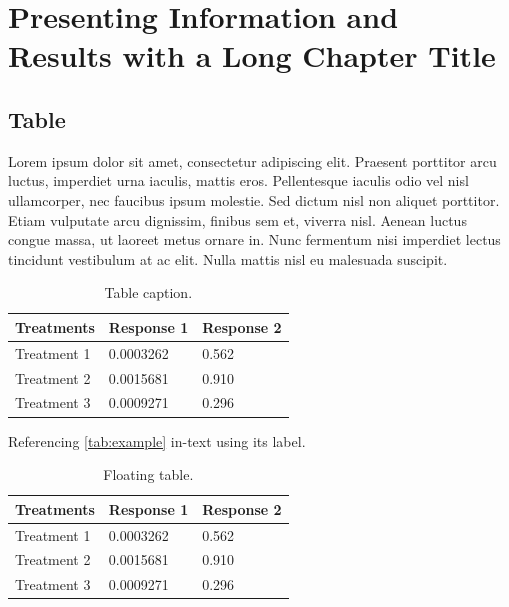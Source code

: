 \chapter{Presenting Information and Results with a Long Chapter Title}

\section{Table}

Lorem ipsum dolor sit amet, consectetur adipiscing elit. Praesent porttitor arcu luctus, imperdiet urna iaculis, mattis eros. Pellentesque iaculis odio vel nisl ullamcorper, nec faucibus ipsum molestie. Sed dictum nisl non aliquet porttitor. Etiam vulputate arcu dignissim, finibus sem et, viverra nisl. Aenean luctus congue massa, ut laoreet metus ornare in. Nunc fermentum nisi imperdiet lectus tincidunt vestibulum at ac elit. Nulla mattis nisl eu malesuada suscipit.

\begin{table}[H] %
	\centering %
	\begin{tabular}{L{0.15\textwidth} R{0.15\textwidth} R{0.15\textwidth}} %
		\toprule
		\textbf{Treatments} & \textbf{Response 1} & \textbf{Response 2}\\
		\midrule
		Treatment 1 & 0.0003262 & 0.562 \\
		Treatment 2 & 0.0015681 & 0.910 \\
		Treatment 3 & 0.0009271 & 0.296 \\
		\bottomrule
	\end{tabular}
	\caption{Table caption.}
	\label{tab:example} %
\end{table}

Referencing \autoref{tab:example} in-text using its label.

\begin{table}[t] %
	\centering %
	\begin{tabular}{L{0.15\textwidth} R{0.15\textwidth} R{0.15\textwidth}} %
		\toprule
		\textbf{Treatments} & \textbf{Response 1} & \textbf{Response 2}\\
		\midrule
		Treatment 1 & 0.0003262 & 0.562 \\
		Treatment 2 & 0.0015681 & 0.910 \\
		Treatment 3 & 0.0009271 & 0.296 \\
		\bottomrule
	\end{tabular}
	\caption{Floating table.}
	\label{tab:floating} %
\end{table}

